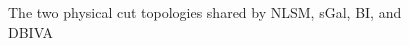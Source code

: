 \documentclass[11pt,letter]{article}
\begin{document}
\begin{figure}[h]
  \begin{center}
	\PhysicalCutOne{}{}{}{} \PhysicalCutTwo{}{}{}{}
  \end{center}
  \caption{The two physical cut topologies shared by NLSM, sGal, BI, and DBIVA}
  \label{fig:emu}
\end{figure}

\end{document}
